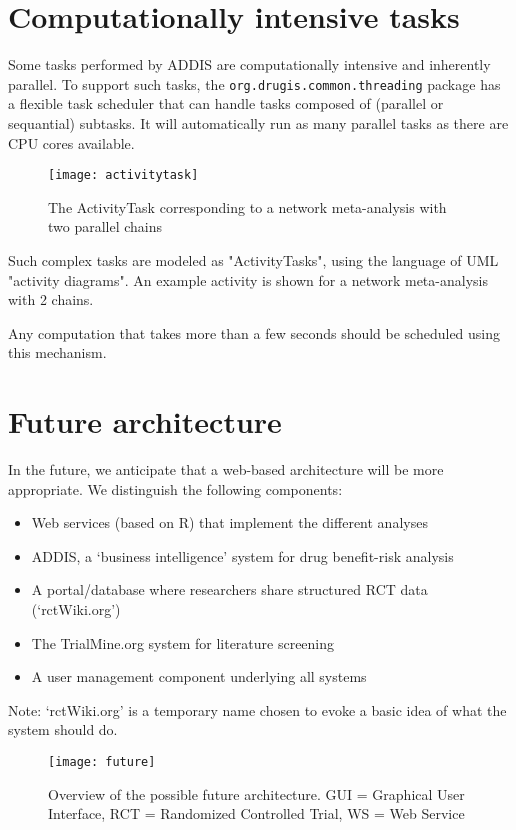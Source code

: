\documentclass[a4paper]{article}
\begin{document}
\section{Computationally intensive tasks}

Some tasks performed by ADDIS are computationally intensive and inherently parallel.
To support such tasks, the {\tt org.drugis.common.threading} package has a flexible task scheduler that can handle tasks composed of (parallel or sequantial) subtasks.
It will automatically run as many parallel tasks as there are CPU cores available.

\begin{figure}[h]
\centering
\texttt{[image: activitytask]}
\caption{The ActivityTask corresponding to a network meta-analysis with two parallel chains}
\end{figure}

Such complex tasks are modeled as "ActivityTasks", using the language of UML "activity diagrams".
An example activity is shown for a network meta-analysis with 2 chains.

Any computation that takes more than a few seconds should be scheduled using this mechanism.

\appendix

\section{Future architecture}

In the future, we anticipate that a web-based architecture will be more appropriate.
We distinguish the following components:
\begin{itemize}
\item Web services (based on R) that implement the different analyses
\item ADDIS, a `business intelligence' system for drug benefit-risk analysis
\item A portal/database where researchers share structured RCT data (`rctWiki.org')
\item The TrialMine.org system for literature screening
\item A user management component underlying all systems
\end{itemize}
Note: `rctWiki.org' is a temporary name chosen to evoke a basic idea of what the system should do.

\begin{figure}[h]
\centering
\texttt{[image: future]}
\caption{Overview of the possible future architecture. GUI = Graphical User Interface, RCT = Randomized Controlled Trial, WS = Web Service}
\end{figure}
\end{document}
